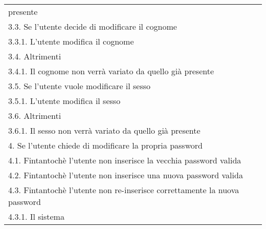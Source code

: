 \begin{table}[H]
\begin{longtable}{@{}|>{\centering\arraybackslash}m{.2\textwidth}|m{.7\textwidth}|@{}}
\begin{tabular}{m{0.9\linewidth}}
		presente\\\hspace{0.5cm}\hspace{0.0cm}3.3. Se l'utente decide di 
		modificare il cognome\\\hspace{1.0cm}\hspace{0.5cm}\hspace{0.0cm}3.3.1. 
		L'utente modifica il cognome\\\hspace{0.5cm}\hspace{0.0cm}3.4. 
		Altrimenti\\\hspace{1.0cm}\hspace{0.5cm}\hspace{0.0cm}3.4.1. Il cognome 
		non verrà variato da quello già 
		presente\\\hspace{0.5cm}\hspace{0.0cm}3.5. Se l'utente vuole modificare 
		il sesso\\\hspace{1.0cm}\hspace{0.5cm}\hspace{0.0cm}3.5.1. L'utente 
		modifica il sesso\\\hspace{0.5cm}\hspace{0.0cm}3.6. 
		Altrimenti\\\hspace{1.0cm}\hspace{0.5cm}\hspace{0.0cm}3.6.1. Il sesso 
		non verrà variato da quello già presente\\\hspace{0.0cm}4. Se l'utente 
		chiede di modificare la propria 
		password\\\hspace{0.5cm}\hspace{0.0cm}4.1. Fintantochè l'utente non 
		inserisce la vecchia password valida\\\hspace{0.5cm}\hspace{0.0cm}4.2. 
		Fintantochè l'utente non inserisce una nuova password 
		valida\\\hspace{0.5cm}\hspace{0.0cm}4.3. Fintantochè l'utente non 
		re-inserisce correttamente la nuova 
		password\\\hspace{1.0cm}\hspace{0.5cm}\hspace{0.0cm}4.3.1. Il sistema 

\end{tabular}
\end{longtable}
\end{table}
